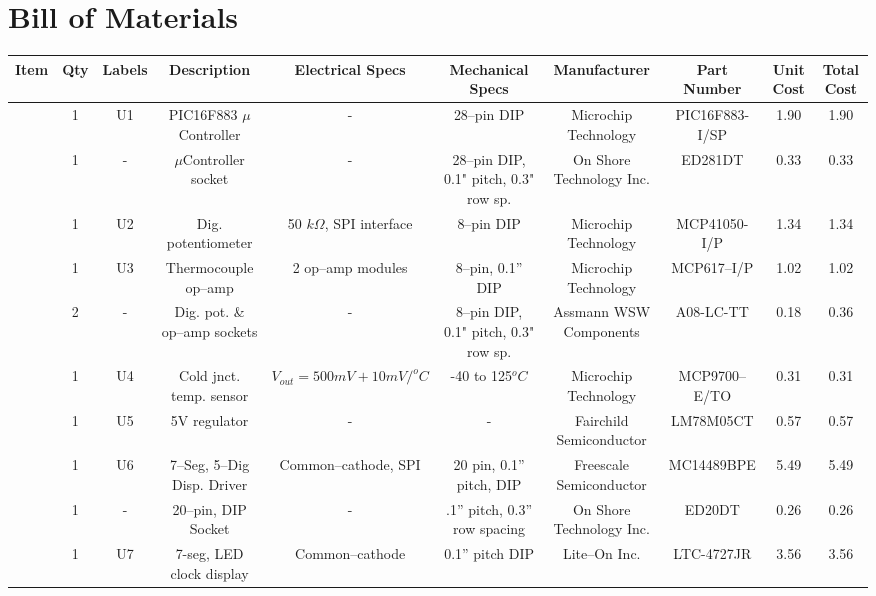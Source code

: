 \documentclass[10pt, twocolumn]{article}
\begin{document}
\pagebreak
\section{Bill of Materials}

\begin{center}
\begin{adjustbox}{max width=\textwidth}
\begin{tabular}{c c c c c c c c c c}
\hline\hline
Item	&Qty	&Labels	&Description		&Electrical Specs		&Mechanical Specs
	&Manufacturer		&Part Number		&Unit Cost	&Total Cost	\\
\hline

	&1	&U1	&PIC16F883 $\mu$Controller	&-				&28--pin DIP
	&Microchip Technology	&PIC16F883-I/SP		&1.90		&1.90	\\

	&1	&-	&$\mu$Controller socket		&-				&28--pin DIP, 0.1" pitch, 0.3" row sp.
	&On Shore Technology Inc.	&ED281DT	&0.33		&0.33	\\

	&1	&U2	&Dig. potentiometer		&50 $k\Omega$, SPI interface	&8--pin DIP
	&Microchip Technology	&MCP41050-I/P		&1.34		&1.34	\\

	&1	&U3	&Thermocouple op--amp	&2 op--amp modules			&8--pin, 0.1” DIP
	&Microchip Technology	&MCP617--I/P		&1.02		&1.02	\\
	
	&2	&-	&Dig. pot. \& op--amp sockets	&-				&8--pin DIP, 0.1" pitch, 0.3" row sp.
	&Assmann WSW Components	&A08-LC-TT		&0.18		&0.36	\\

	&1	&U4	&Cold jnct. temp. sensor	&$V_{out}=500mV+10mV/^{o}C$ 	&-40 to 125$^{o}C$
	&Microchip Technology	&MCP9700--E/TO		&0.31		&0.31	\\

	&1	&U5	&5V regulator			&-				&-
	&Fairchild Semiconductor	&LM78M05CT	&0.57		&0.57	\\

	&1	&U6	&7--Seg, 5--Dig Disp. Driver	&Common--cathode, SPI	&20 pin, 0.1'' pitch, DIP
	&Freescale Semiconductor	&MC14489BPE	&5.49		&5.49	\\

	&1	&-	&20--pin, DIP Socket		&-				&.1” pitch, 0.3” row spacing
	&On Shore Technology Inc.	&ED20DT 	&0.26		&0.26	\\

	&1	&U7	&7-seg, LED clock display	&Common--cathode		&0.1” pitch DIP
	&Lite--On Inc.		&LTC-4727JR		&3.56		&3.56	\\


\end{tabular}
\end{adjustbox}
\end{center}
\end{document}
